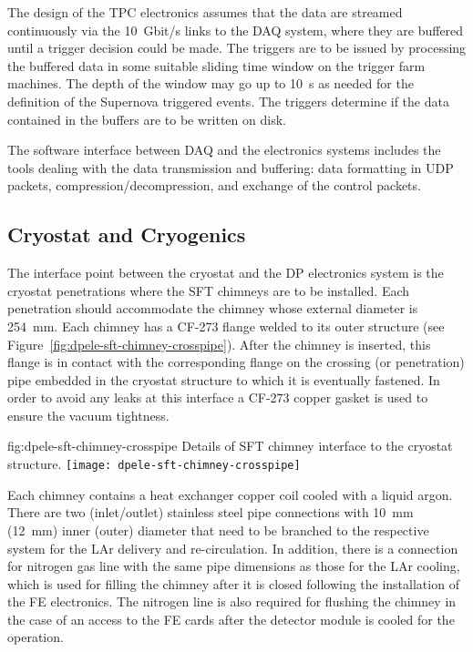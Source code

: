 The design of the TPC electronics assumes that the data are streamed continuously via the \SI{10}{Gbit/s} links to the DAQ system, where they are buffered until a trigger decision could be made. The triggers are to be issued by processing the buffered data in some suitable sliding time window on the trigger farm machines. The depth of the window may go up to \SI{10}{s} as needed for the definition of the Supernova triggered events. The triggers determine if the data contained in the buffers are to be written on disk. 

The software interface between DAQ and the electronics systems includes the tools dealing with the data transmission and buffering: data formatting in UDP packets, compression/decompression, and exchange of the control packets.

\subsection{Cryostat and Cryogenics}
\label{sec:fddp-tpc-elec-intfc-cryo}

The interface point between the cryostat and the DP electronics system is the cryostat penetrations where the SFT chimneys are to be installed. Each penetration should accommodate the chimney whose external diameter is \SI{254}{\mm}. Each chimney has a CF-273 flange welded to its outer structure (see Figure~\ref{fig:dpele-sft-chimney-crosspipe}). After the chimney is inserted, this flange is in contact with the corresponding flange on the crossing (or penetration) pipe embedded in the cryostat structure to which it is eventually fastened. In order to avoid any leaks at this interface a CF-273 copper gasket is used to ensure the vacuum tightness.  

\begin{dunefigure}{fig:dpele-sft-chimney-crosspipe}
{Details of SFT chimney interface to the cryostat structure.}
\texttt{[image: dpele-sft-chimney-crosspipe]}
\end{dunefigure}

Each chimney contains a heat exchanger copper coil cooled with a liquid argon. There are two (inlet/outlet) stainless steel pipe connections with \SI{10}{\mm} (\SI{12}{\mm}) inner (outer) diameter that need to be branched to the respective system for the LAr delivery and re-circulation. In addition, there is a connection for nitrogen gas line with the same pipe dimensions as those for the LAr cooling, which is used for filling the chimney after it is closed following the installation of the FE electronics. The nitrogen line is also required for flushing the chimney in the case of an access to the FE cards after the detector module is cooled for the operation. 

